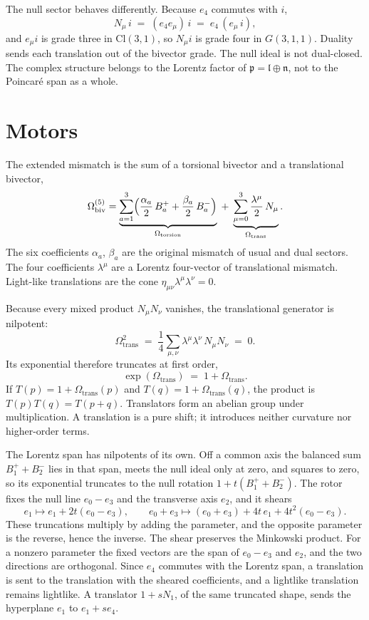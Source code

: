 \documentclass[a4paper]{article}
\begin{document}
The null sector behaves differently. Because \(e_{4}\) commutes with \(i\),
\[
N_{\mu}\,i \;=\; (e_{4}e_{\mu})\,i \;=\; e_{4}\,(e_{\mu}\,i),
\]
and \(e_{\mu}i\) is grade three in \(\mathrm{Cl}(3,1)\), so \(N_{\mu}i\) is grade four in \(G(3,1,1)\). Duality sends each translation out of the bivector grade. The null ideal is not dual-closed. The complex structure belongs to the Lorentz factor of \(\mathfrak{p}=\mathfrak{l}\oplus\mathfrak{n}\), not to the Poincar\'{e} span as a whole.

\section{Motors}
\label{sec:motors}

The extended mismatch is the sum of a torsional bivector and a translational bivector,
\begin{equation}
\Omega_{\mathrm{biv}}^{(5)}
= \underbrace{\sum_{a=1}^{3} \Bigl( \frac{\alpha_{a}}{2}\, B_{a}^{+} + \frac{\beta_{a}}{2}\, B_{a}^{-} \Bigr)}_{\Omega_{\mathrm{torsion}}}
\;+\;
\underbrace{\sum_{\mu=0}^{3} \frac{\lambda^{\mu}}{2}\, N_{\mu}}_{\Omega_{\mathrm{trans}}}.
\label{eq:Omega-decomp}
\end{equation}
The six coefficients \(\alpha_{a}\), \(\beta_{a}\) are the original mismatch of usual and dual sectors. The four coefficients \(\lambda^{\mu}\) are a Lorentz four-vector of translational mismatch. Light-like translations are the cone \(\eta_{\mu\nu}\lambda^{\mu}\lambda^{\nu}=0\).

Because every mixed product \(N_{\mu}N_{\nu}\) vanishes, the translational generator is nilpotent:
\[
\Omega_{\mathrm{trans}}^{2}
\;=\;
\frac{1}{4}\sum_{\mu,\nu}\lambda^{\mu}\lambda^{\nu}\,N_{\mu}N_{\nu}
\;=\; 0.
\]
Its exponential therefore truncates at first order,
\[
\exp(\Omega_{\mathrm{trans}}) \;=\; 1+\Omega_{\mathrm{trans}}.
\]
If \(T(p)=1+\Omega_{\mathrm{trans}}(p)\) and \(T(q)=1+\Omega_{\mathrm{trans}}(q)\), the product is \(T(p)T(q)=T(p+q)\). Translators form an abelian group under multiplication. A translation is a pure shift; it introduces neither curvature nor higher-order terms.

The Lorentz span has nilpotents of its own. Off a common axis the balanced sum \(B^{+}_{1}+B^{-}_{2}\) lies in that span, meets the null ideal only at zero, and squares to zero, so its exponential truncates to the null rotation \(1+t(B^{+}_{1}+B^{-}_{2})\). The rotor fixes the null line \(e_{0}-e_{3}\) and the transverse axis \(e_{2}\), and it shears
\[
e_{1}\mapsto e_{1}+2t(e_{0}-e_{3}),
\qquad
e_{0}+e_{3}\mapsto (e_{0}+e_{3})+4t\,e_{1}+4t^{2}(e_{0}-e_{3}).
\]
These truncations multiply by adding the parameter, and the opposite parameter is the reverse, hence the inverse. The shear preserves the Minkowski product. For a nonzero parameter the fixed vectors are the span of \(e_{0}-e_{3}\) and \(e_{2}\), and the two directions are orthogonal. Since \(e_{4}\) commutes with the Lorentz span, a translation is sent to the translation with the sheared coefficients, and a lightlike translation remains lightlike. A translator \(1+s N_{1}\), of the same truncated shape, sends the hyperplane \(e_{1}\) to \(e_{1}+s e_{4}\).
\end{document}

